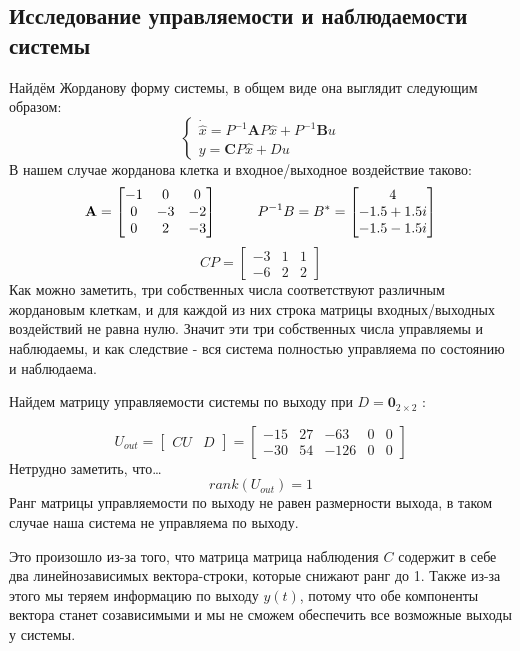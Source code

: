 \subsection{Исследование управляемости и наблюдаемости системы}


Найдём Жорданову форму системы, в общем виде она выглядит следующим образом:
$$
    \begin{cases}
      \dot{\hat{x}} = P^{-1}\boldsymbol{A}P \hat{x} + P^{-1}\boldsymbol{B} u \\
      y = \boldsymbol{C}P\hat{x} + Du
    \end{cases}
$$
В нашем случае жорданова клетка и входное/выходное воздействие таково:
$$
    \mathbf{A} = \begin{bmatrix}
        -1 & 0 & 0 \\
        0 & -3 & -2 \\
        0 & 2 & -3 
        \end{bmatrix} \hspace*{1cm} 
    P^{-1}B = B^* = \begin{bmatrix}
        4 \\ -1.5+1.5i \\ -1.5-1.5i
        \end{bmatrix}
$$
$$
    CP= \begin{bmatrix}
        -3 & 1 & 1 \\
        -6 & 2 & 2 
        \end{bmatrix}
$$
Как можно заметить, три собственных числа соответствуют различным жордановым клеткам, и для каждой из них строка матрицы входных/выходных воздействий не равна нулю.
Значит эти три собственных числа управляемы и наблюдаемы, и как следствие - вся система полностью управляема по состоянию и наблюдаема.





Найдем матрицу управляемости системы по выходу при $D = \mathbf{0}_{2×2}$ :

$$
    U_{out} = \begin{bmatrix}
      CU & D
    \end{bmatrix} =  \begin{bmatrix}
      -15 & 27 & -63 & 0 & 0 \\
      -30 & 54 & -126 & 0 & 0 
    \end{bmatrix}
$$
Нетрудно заметить, что\dots
$$
  rank(U_{out}) = 1
$$
Ранг матрицы управляемости по выходу не равен размерности выхода, в таком случае наша система не управляема по выходу.

Это произошло из-за того, что матрица матрица наблюдения $C$ содержит в себе два линейнозависимых вектора-строки, которые снижают ранг до 1.
Также из-за этого мы теряем информацию по выходу $y(t)$, потому что обе компоненты вектора станет созависимыми и мы не сможем обеспечить все возможные выходы у системы.


